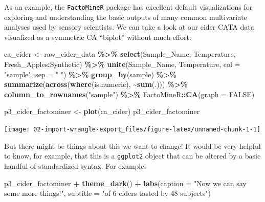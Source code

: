 \documentclass[
]{book}
\newenvironment{Shaded}{\begin{snugshade}}{\end{snugshade}}
\newcommand{\AttributeTok}[1]{\textcolor[rgb]{0.13,0.29,0.53}{#1}}
\newcommand{\ConstantTok}[1]{\textcolor[rgb]{0.56,0.35,0.01}{#1}}
\newcommand{\FunctionTok}[1]{\textcolor[rgb]{0.13,0.29,0.53}{\textbf{#1}}}
\newcommand{\NormalTok}[1]{#1}
\newcommand{\OtherTok}[1]{\textcolor[rgb]{0.56,0.35,0.01}{#1}}
\newcommand{\SpecialCharTok}[1]{\textcolor[rgb]{0.81,0.36,0.00}{\textbf{#1}}}
\newcommand{\StringTok}[1]{\textcolor[rgb]{0.31,0.60,0.02}{#1}}
\begin{document}
As an example, the \texttt{FactoMineR} package has excellent default visualizations for exploring and understanding the basic outputs of many common multivariate analyses used by sensory scientists. We can take a look at our cider CATA data visualized as a symmetric CA ``biplot'' without much effort:

\begin{Shaded}
\begin{Highlighting}[]
\NormalTok{ca\_cider }\OtherTok{\textless{}{-}} 
\NormalTok{  raw\_cider\_data }\SpecialCharTok{\%\textgreater{}\%}
  \FunctionTok{select}\NormalTok{(Sample\_Name, Temperature, Fresh\_Apples}\SpecialCharTok{:}\NormalTok{Synthetic) }\SpecialCharTok{\%\textgreater{}\%}
  \FunctionTok{unite}\NormalTok{(Sample\_Name, Temperature, }\AttributeTok{col =} \StringTok{"sample"}\NormalTok{, }\AttributeTok{sep =} \StringTok{" "}\NormalTok{) }\SpecialCharTok{\%\textgreater{}\%}
  \FunctionTok{group\_by}\NormalTok{(sample) }\SpecialCharTok{\%\textgreater{}\%}
  \FunctionTok{summarize}\NormalTok{(}\FunctionTok{across}\NormalTok{(}\FunctionTok{where}\NormalTok{(is.numeric), }\SpecialCharTok{\textasciitilde{}}\FunctionTok{sum}\NormalTok{(.))) }\SpecialCharTok{\%\textgreater{}\%}
  \FunctionTok{column\_to\_rownames}\NormalTok{(}\StringTok{"sample"}\NormalTok{) }\SpecialCharTok{\%\textgreater{}\%}
\NormalTok{  FactoMineR}\SpecialCharTok{::}\FunctionTok{CA}\NormalTok{(}\AttributeTok{graph =} \ConstantTok{FALSE}\NormalTok{)}

\NormalTok{p3\_cider\_factominer }\OtherTok{\textless{}{-}} \FunctionTok{plot}\NormalTok{(ca\_cider)}
\NormalTok{p3\_cider\_factominer}
\end{Highlighting}
\end{Shaded}

\begin{center}\texttt{[image: 02-import-wrangle-export\_files/figure-latex/unnamed-chunk-1-1]} \end{center}

But there might be things about this we want to change! It would be very helpful to know, for example, that this is a \texttt{ggplot2} object that can be altered by a basic handful of standardized syntax. For example:

\begin{Shaded}
\begin{Highlighting}[]
\NormalTok{p3\_cider\_factominer }\SpecialCharTok{+}
  \FunctionTok{theme\_dark}\NormalTok{() }\SpecialCharTok{+} 
  \FunctionTok{labs}\NormalTok{(}\AttributeTok{caption =} \StringTok{"Now we can say some more things!"}\NormalTok{, }
       \AttributeTok{subtitle =} \StringTok{"of 6 ciders tasted by 48 subjects"}\NormalTok{)}
\end{Highlighting}
\end{Shaded}
\end{document}
